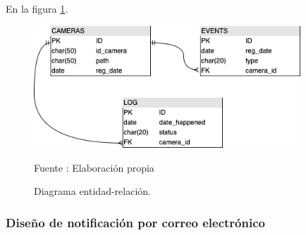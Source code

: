 En la figura \ref{fig:db_diagram}.
\begin{figure}[H]
    \begin{center}
        \includegraphics[width=10cm]{img/capitulo_4/db.png}
    \end{center}
    \begin{center}
        \caption{Diagrama entidad-relación.}
        Fuente : Elaboración propia
        \label{fig:db_diagram}
    \end{center}
\end{figure}

\subsubsection{Diseño de notificación por correo electrónico}
